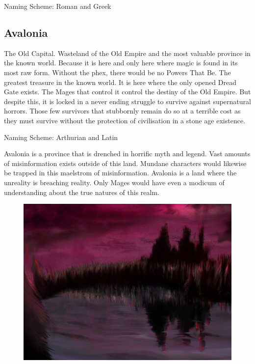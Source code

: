 \begin{multicols}{2}
Naming Scheme: Roman and Greek

\subsection{Avalonia} 

The Old Capital. Wasteland of the Old Empire and the most valuable province in the known world. Because it is here and only here where magic is found in its most raw form. Without the phex, there would be no Powers That Be. The greatest treasure in the known world. It is here where the only opened Dread Gate exists. The Mages that control it control the destiny of the Old Empire. But despite this, it is locked in a never ending struggle to survive against supernatural horrors. Those few survivors that stubbornly remain do so at a terrible cost as they must survive without the protection of civilisation in a stone age existence.

Naming Scheme: Arthurian and Latin

Avalonia is a province that is drenched in horrific myth and legend. Vast amounts of misinformation exists outside of this land. Mundane characters would likewise be trapped in this maelstrom of misinformation. Avalonia is a land where the unreality is breaching reality. Only Mages would have even a modicum of understanding about the true natures of this realm. 
\begin{figure}[h]
\includegraphics[width=\columnwidth]{avalonia4}
\end{figure}


\end{multicols}
